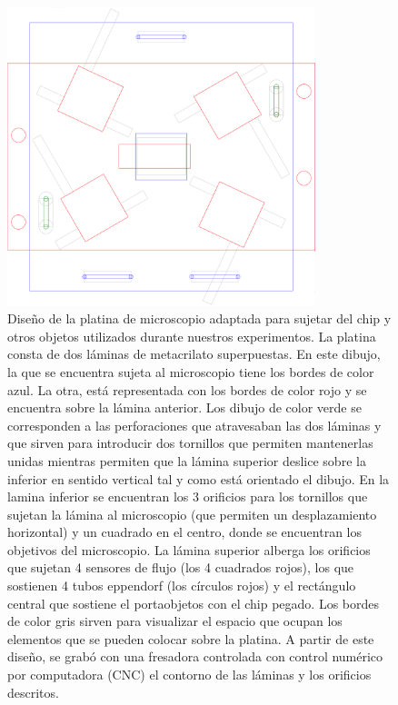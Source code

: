 \begin{figure}[H]
    \begin{center}
         \includegraphics[width=0.8\textwidth]{3_metodologia/capas_ULTIMO2.png}
    \end{center}
    \caption{\small Diseño de la platina de microscopio adaptada para sujetar del chip y otros objetos utilizados durante nuestros experimentos. La platina consta de dos láminas de metacrilato superpuestas. En este dibujo, la que se encuentra sujeta al microscopio tiene los bordes de color azul. La otra, está representada con los bordes de color rojo y se encuentra sobre la lámina anterior. Los dibujo de color verde se corresponden a las perforaciones que atravesaban las dos láminas y que sirven para introducir dos tornillos que permiten mantenerlas unidas mientras permiten que la lámina superior deslice sobre la inferior en sentido vertical tal y como está orientado el dibujo. En la lamina inferior se encuentran los 3 orificios para los tornillos que sujetan la lámina al microscopio (que permiten un desplazamiento horizontal) y un cuadrado en el centro, donde se encuentran los objetivos del microscopio. La lámina superior alberga los orificios que sujetan 4 sensores de flujo (los 4 cuadrados rojos), los que sostienen 4 tubos eppendorf (los círculos rojos) y el rectángulo central que sostiene el portaobjetos con el chip pegado. Los bordes de color gris sirven para visualizar el espacio que ocupan los elementos que se pueden colocar sobre la platina. A partir de este diseño, se grabó con una fresadora controlada con control numérico por computadora (CNC) el contorno de las láminas y los orificios descritos.}
    \label{fig:platina_microscopio}
\end{figure}


